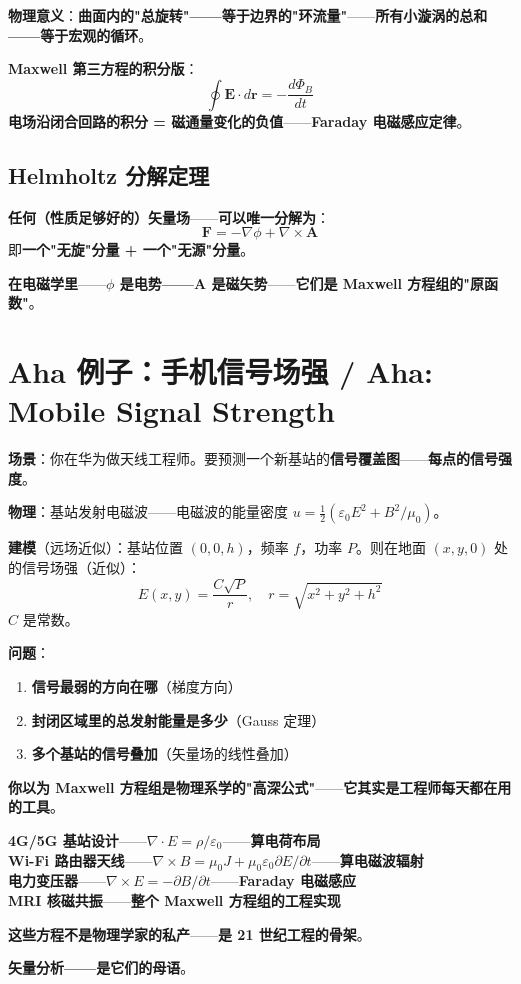 \textbf{物理意义}：\textbf{曲面内的"总旋转"——等于边界的"环流量"}——\textbf{所有小漩涡的总和——等于宏观的循环}。

\textbf{Maxwell 第三方程的积分版}：
\[
\oint \bm{E} \cdot d\bm{r} = -\frac{d\Phi_B}{dt}
\]
\textbf{电场沿闭合回路的积分 = 磁通量变化的负值}——\textbf{Faraday 电磁感应定律}。

\subsection{Helmholtz 分解定理}

\textbf{任何（性质足够好的）矢量场}——\textbf{可以唯一分解为}：
\[
\bm{F} = -\nabla \phi + \nabla \times \bm{A}
\]
即\textbf{一个"无旋"分量 + 一个"无源"分量}。

\textbf{在电磁学里}——\textbf{$\phi$ 是电势——$\bm{A}$ 是磁矢势}——\textbf{它们是 Maxwell 方程组的"原函数"}。

\section{Aha 例子：手机信号场强 / Aha: Mobile Signal Strength}

\textbf{场景}：你在华为做天线工程师。要预测一个新基站的\textbf{信号覆盖图}——\textbf{每点的信号强度}。

\textbf{物理}：基站发射电磁波——电磁波的能量密度 $u = \frac{1}{2}(\varepsilon_0 E^2 + B^2/\mu_0)$。

\textbf{建模}（远场近似）：基站位置 $(0,0,h)$，频率 $f$，功率 $P$。则在地面 $(x, y, 0)$ 处的信号场强（近似）：
\[
E(x, y) = \frac{C \sqrt{P}}{r}, \quad r = \sqrt{x^2 + y^2 + h^2}
\]
$C$ 是常数。

\textbf{问题}：

\begin{enumerate}
\item \textbf{信号最弱的方向在哪}（梯度方向）
\item \textbf{封闭区域里的总发射能量是多少}（Gauss 定理）
\item \textbf{多个基站的信号叠加}（矢量场的线性叠加）
\end{enumerate}

\begin{tcolorbox}[ahabox={Aha: Maxwell 方程组的几何意义}]
\textbf{你以为 Maxwell 方程组是物理系学的"高深公式"}——\textbf{它其实是工程师每天都在用的工具}。

\medskip

\textbf{4G/5G 基站设计}——\textbf{$\nabla \cdot E = \rho/\varepsilon_0$}——\textbf{算电荷布局}\\
\textbf{Wi-Fi 路由器天线}——\textbf{$\nabla \times B = \mu_0 J + \mu_0 \varepsilon_0 \partial E/\partial t$}——\textbf{算电磁波辐射}\\
\textbf{电力变压器}——\textbf{$\nabla \times E = -\partial B/\partial t$}——\textbf{Faraday 电磁感应}\\
\textbf{MRI 核磁共振}——\textbf{整个 Maxwell 方程组的工程实现}

\medskip

\textbf{这些方程不是物理学家的私产}——\textbf{是 21 世纪工程的骨架}。

\medskip

\textbf{矢量分析——是它们的母语}。
\end{tcolorbox}


